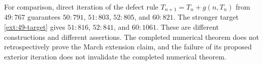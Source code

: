 For comparison, direct iteration of the defect rule
$T_{n+1}=T_n+g(n,T_n)$ from $49:767$ guarantees
$50:791$, $51:803$, $52:805$, and $60:821$.
The stronger target \eqref{ext:49-target} gives $51:816$, $52:841$, and
$60:1061$.  These are different constructions and different assertions.
The completed numerical theorem does not retrospectively prove the
March extension claim, and the failure of its proposed exterior
iteration does not invalidate the completed numerical theorem.
